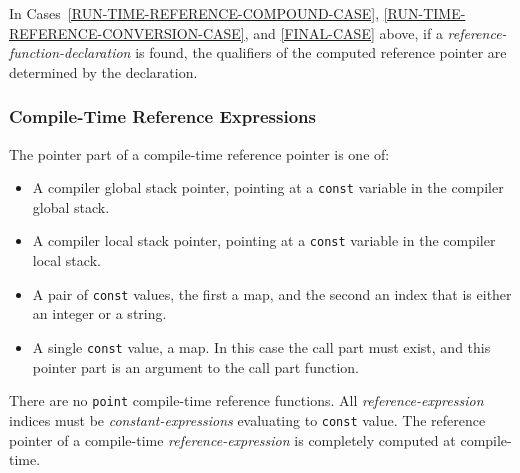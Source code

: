 \documentclass[12pt]{article}
\begin{document}
In Cases~\ref{RUN-TIME-REFERENCE-COMPOUND-CASE},
\ref{RUN-TIME-REFERENCE-CONVERSION-CASE},
and \ref{FINAL-CASE} above, if a
{\em reference-function-declaration} is found, the
qualifiers of the computed reference pointer are determined by
the declaration.

\subsubsection{Compile-Time Reference Expressions}
\label{COMPILE-TIME-REFERENCE-EXPRESSIONS}

The pointer part of a compile-time reference pointer is one of:
\begin{itemize}
\item A compiler global stack pointer, pointing at a {\tt const}
variable in the compiler global stack.
\item A compiler local stack pointer, pointing at a {\tt const}
variable in the compiler local stack.
\item A pair of {\tt const} values, the first a map, and the
second an index that is either an integer or a string.
\item A single {\tt const} value, a map.  In this case the call
part must exist, and this pointer part is an argument to the call part
function.
\end{itemize}
There are no {\tt point} compile-time reference functions.
All {\em reference-expression} indices must be {\em constant-expres\-sions}
evaluating to {\tt const} value.
The reference pointer of a compile-time
{\em reference-expression} is completely computed at compile-time.
\end{document}
